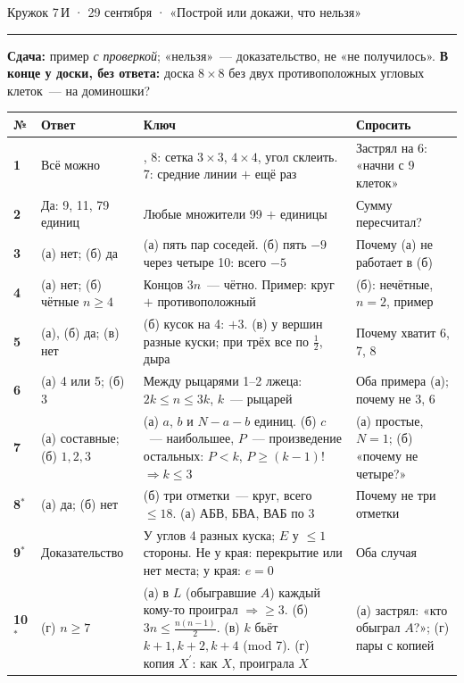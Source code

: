 \documentclass[10pt,a4paper]{article}
\begin{document}
\hfill{\small Кружок 7\,И · 29 сентября · «Построй или докажи, что нельзя»}
\vspace{3pt}\hrule\vspace{4pt}
\small \textbf{Сдача:} пример \emph{с проверкой}; «нельзя»~--- доказательство, не «не получилось».
\textbf{В конце у доски, без ответа:} доска $8\times8$ без двух противоположных угловых клеток~--- на доминошки?
\vspace{4pt}

\normalsize\renewcommand{\arraystretch}{1.6}
\noindent\begin{tabularx}{\linewidth}{|>{\bfseries}l|>{\raggedright\arraybackslash}p{2.7cm}|>{\raggedright\arraybackslash}X|>{\raggedright\arraybackslash}p{3.8cm}|}
\hline
№ & Ответ & Ключ & Спросить\\\hline

1 & Всё можно & 6, 8: сетка $3\times3$, $4\times4$, угол склеить. 7: средние линии $+$ ещё раз & Застрял на 6: «начни с 9 клеток»\\\hline
2 & Да: 9, 11, 79 единиц & Любые множители 99 $+$ единицы & Сумму пересчитал?\\\hline
3 & (а) нет; (б) да & (а) пять пар соседей. (б) пять $-9$ через четыре 10: всего $-5$ & Почему (а) не работает в (б)\\\hline
4 & (а) нет; (б) чётные $n\ge4$ & Концов $3n$~--- чётно. Пример: круг $+$ противоположный & (б): нечётные, $n=2$, пример\\\hline
5 & (а), (б) да; (в) нет & (б) кусок на 4: $+3$. (в) у вершин разные куски; при трёх все по $\tfrac12$, дыра & Почему хватит 6, 7, 8\\\hline
6 & (а) 4 или 5; (б) 3 & Между рыцарями 1--2 лжеца: $2k\le n\le3k$, $k$~--- рыцарей & Оба примера (а); почему не 3, 6\\\hline
7 & (а) составные; (б) $1,2,3$ & (а) $a$, $b$ и $N{-}a{-}b$ единиц. (б) $c$~--- наибольшее, $P$~--- произведение остальных: $P<k$, $P\ge(k{-}1)!$ $\Rightarrow k\le3$ & (а) простые, $N=1$; (б) «почему не четыре?»\\\hline
8$^*$ & (а) да; (б) нет & (б) три отметки~--- круг, всего $\le18$. (а) АБВ, БВА, ВАБ по 3 & Почему не три отметки\\\hline
9$^*$ & Доказательство & У углов 4 разных куска; $E$ у $\le1$ стороны. Не у края: перекрытие или нет места; у края: $e=0$ & Оба случая\\\hline
10$^*$ & (г) $n\ge7$ & (а) в $L$ (обыгравшие $A$) каждый кому-то проиграл $\Rightarrow\ge3$. (б) $3n\le\tfrac{n(n-1)}2$. (в) $k$ бьёт $k{+}1,k{+}2,k{+}4$ (mod 7). (г) копия $X^{\prime}$: как $X$, проиграла $X$ & (а) застрял: «кто обыграл $A$?»; (г) пары с копией\\\hline
\end{tabularx}
\end{document}
